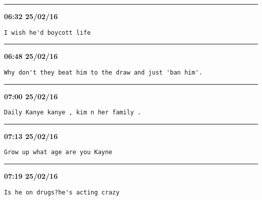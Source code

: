 \hrule%

\begin{adjustwidth}{0cm}{0cm}
\footnotesize \textbf{06:32 25/02/16}

\begin{lstlisting}[breaklines, breakatwhitespace, basicstyle=\small, frame=leftline]
I wish he'd boycott life
\end{lstlisting}
\end{adjustwidth}

\hrule%

\begin{adjustwidth}{0cm}{0cm}
\footnotesize \textbf{06:48 25/02/16}

\begin{lstlisting}[breaklines, breakatwhitespace, basicstyle=\small, frame=leftline]
Why don't they beat him to the draw and just 'ban him'.
\end{lstlisting}
\end{adjustwidth}

\hrule%

\begin{adjustwidth}{0cm}{0cm}
\footnotesize \textbf{07:00 25/02/16}

\begin{lstlisting}[breaklines, breakatwhitespace, basicstyle=\small, frame=leftline]
Daily Kanye kanye , kim n her family .
\end{lstlisting}
\end{adjustwidth}

\hrule%

\begin{adjustwidth}{0cm}{0cm}
\footnotesize \textbf{07:13 25/02/16}

\begin{lstlisting}[breaklines, breakatwhitespace, basicstyle=\small, frame=leftline]
Grow up what age are you Kayne
\end{lstlisting}
\end{adjustwidth}

\hrule%

\begin{adjustwidth}{0cm}{0cm}
\footnotesize \textbf{07:19 25/02/16}

\begin{lstlisting}[breaklines, breakatwhitespace, basicstyle=\small, frame=leftline]
Is he on drugs?he's acting crazy
\end{lstlisting}
\end{adjustwidth}

